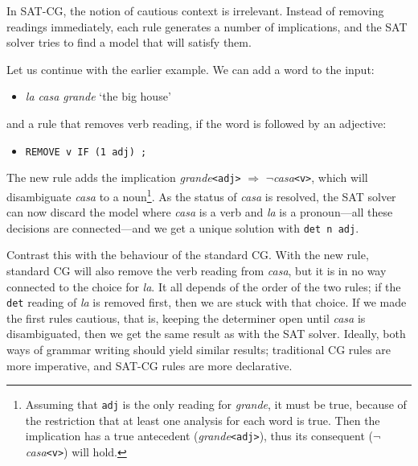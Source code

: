 \documentclass[11pt]{article}
\begin{document}
In SAT-CG, the notion of cautious context is irrelevant. Instead of
removing readings immediately,  each rule generates a  number of
implications, and the SAT solver tries to find a model that will satisfy them. 


Let us continue with the earlier example. 
We can add a word to the input:
\begin{itemize}
\item [] \emph{la casa grande} `the big house'
\end{itemize}
and a rule that removes verb reading, if the word is followed by an adjective:
\begin{itemize}
\item [] \texttt{REMOVE v IF (1 adj) ;}
\end{itemize}

The new rule adds the implication
 \emph{grande}\texttt{<adj>} $\Rightarrow$
 $\neg$\emph{casa}\texttt{<v>}, which will
disambiguate  \emph{casa} to a noun\footnote{Assuming that
  \texttt{adj} is the only reading for \emph{grande}, it must be true,
  because of the restriction that at least one analysis for each word
  is true. Then the implication has a true antecedent (\emph{grande}\texttt{<adj>}), thus its
  consequent ($\neg$\emph{casa}\texttt{<v>}) will hold.}. 
As the status of \emph{casa} is resolved, the SAT solver can now
discard the model where \emph{casa} is a verb and \emph{la} is a
pronoun---all these decisions are connected---and we get a unique solution with \texttt{det n adj}.

Contrast this with the behaviour of the standard CG.
With the new rule, standard CG will also remove the verb reading from \emph{casa}, 
but it is in no way connected to the choice for \emph{la}. It all
depends of the order of the two rules; if the \texttt{det} reading of
\emph{la} is removed first, then we are stuck with that choice.
If we made the first rules cautious, that is, keeping the determiner
open until \emph{casa} is disambiguated, then we get the same
result as with the SAT solver.
Ideally, both ways of grammar writing should yield similar results;
traditional CG rules are more imperative, and SAT-CG
rules are more declarative.
\end{document}
